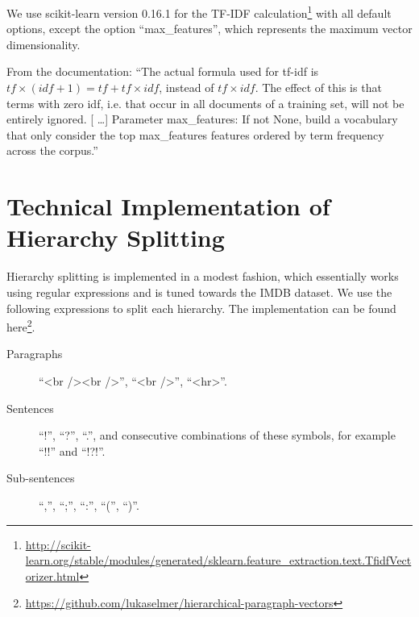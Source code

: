 We use scikit-learn version 0.16.1 for the TF-IDF calculation\footnote{\url{http://scikit-learn.org/stable/modules/generated/sklearn.feature_extraction.text.TfidfVectorizer.html}} with all default options, except the option ``max\_features'', which represents the maximum vector dimensionality.

From the documentation: ``The actual formula used for tf-idf is $tf \times (idf + 1) = tf + tf \times idf$, instead of $tf \times idf$. The effect of this is that terms with zero idf, i.e. that occur in all documents of a training set, will not be entirely ignored. [ \ldots ] Parameter max\_features: If not None, build a vocabulary that only consider the top max\_features features ordered by term frequency across the corpus.''

\section{Technical Implementation of Hierarchy Splitting}\label{appendix:hierarchy-splitting}

Hierarchy splitting is implemented in a modest fashion, which essentially works using regular expressions and is tuned towards the IMDB dataset. We use the following expressions to split each hierarchy. The implementation can be found here\footnote{\url{https://github.com/lukaselmer/hierarchical-paragraph-vectors}}.

\begin{description}
	\item[Paragraphs] ``\textless br /\textgreater \textless br /\textgreater'', ``\textless br /\textgreater'', ``\textless hr\textgreater''.
	\item[Sentences] ``!'', ``?'', ``.'', and consecutive combinations of these symbols, for example ``!!'' and ``!?!''.
	\item[Sub-sentences] ``,'', ``;'', ``:'', ``('', ``)''.
\end{description}